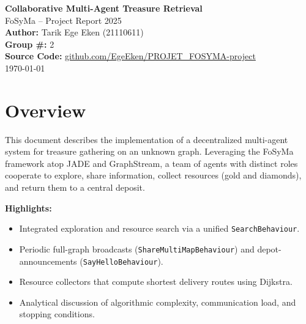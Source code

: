 \documentclass[a4paper,11pt]{article}
\begin{document}
\begin{titlepage}
  \centering
  \vspace*{2cm}
  {\LARGE \textbf{Collaborative Multi-Agent Treasure Retrieval}\\[1ex]
  \large FoSyMa – Project Report 2025}\\[2cm]

  {\Large \textbf{Author:} Tarik Ege Eken (21110611)}\\[1.5cm]

  {\large \textbf{Group \#:} 2}\\[2cm]

  {\large \textbf{Source Code:} \href{https://github.com/EgeEken/PROJET_FOSYMA}{github.com/EgeEken/PROJET_FOSYMA-project}}\\

  \vfill
  {\large \today}
\end{titlepage}

\tableofcontents
\newpage

\section{Overview}
This document describes the implementation of a decentralized multi-agent system for treasure gathering on an unknown graph. Leveraging the FoSyMa framework atop JADE and GraphStream, a team of agents with distinct roles cooperate to explore, share information, collect resources (gold and diamonds), and return them to a central deposit.

\textbf{Highlights:}
\begin{itemize}
  \item Integrated exploration and resource search via a unified \texttt{SearchBehaviour}.
  \item Periodic full-graph broadcasts (\texttt{ShareMultiMapBehaviour}) and depot-announcements (\texttt{SayHelloBehaviour}).
  \item Resource collectors that compute shortest delivery routes using Dijkstra.
  \item Analytical discussion of algorithmic complexity, communication load, and stopping conditions.
\end{itemize}
\end{document}
